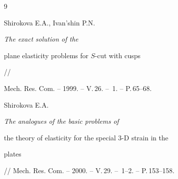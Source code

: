 \begin{thebibliography}{9}


Shirokova E.A., Ivan'shin P.N. {\em The exact solution of the


plane elasticity problems for $S$-cut with cusps} //


Mech. Res. Com. -- 1999. -- V.\,26. -- \No\,1. -- P.\,65--68.




Shirokova E.A. {\em The analogues of the basic problems of


the theory of elasticity for the special $3$-$\mathrm D$ strain in the


plates} // Mech. Res. Com. -- 2000. -- V.\,29. -- \No\,1--2. -- P.\,153--158.








\end{thebibliography}





\vskip 2cm












\label{end}











